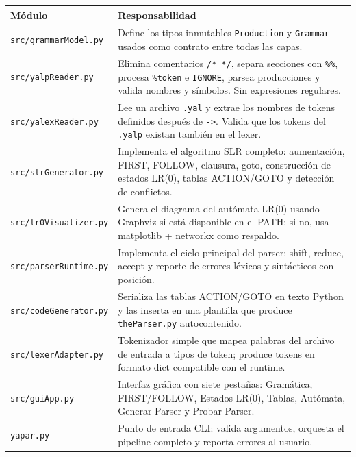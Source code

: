 \documentclass[11pt,a4paper]{article}
\begin{document}
\begin{center}
\begin{tabular}{lp{9cm}}
  \toprule
  \textbf{Módulo} & \textbf{Responsabilidad} \\
  \midrule
  \texttt{src/grammarModel.py}  &
    Define los tipos inmutables \texttt{Production} y \texttt{Grammar} usados
    como contrato entre todas las capas. \\
  \texttt{src/yalpReader.py}    &
    Elimina comentarios \texttt{/* */}, separa secciones con \texttt{\%\%},
    procesa \texttt{\%token} e \texttt{IGNORE}, parsea producciones y valida
    nombres y símbolos. Sin expresiones regulares. \\
  \texttt{src/yalexReader.py}   &
    Lee un archivo \texttt{.yal} y extrae los nombres de tokens definidos
    después de \texttt{->}. Valida que los tokens del \texttt{.yalp} existan
    también en el lexer. \\
  \texttt{src/slrGenerator.py}  &
    Implementa el algoritmo SLR completo: aumentación, FIRST, FOLLOW,
    clausura, goto, construcción de estados LR(0), tablas ACTION/GOTO y
    detección de conflictos. \\
  \texttt{src/lr0Visualizer.py} &
    Genera el diagrama del autómata LR(0) usando Graphviz si está disponible
    en el PATH; si no, usa matplotlib + networkx como respaldo. \\
  \texttt{src/parserRuntime.py} &
    Implementa el ciclo principal del parser: shift, reduce, accept y reporte
    de errores léxicos y sintácticos con posición. \\
  \texttt{src/codeGenerator.py} &
    Serializa las tablas ACTION/GOTO en texto Python y las inserta en una
    plantilla que produce \texttt{theParser.py} autocontenido. \\
  \texttt{src/lexerAdapter.py}  &
    Tokenizador simple que mapea palabras del archivo de entrada a tipos de
    token; produce tokens en formato dict compatible con el runtime. \\
  \texttt{src/guiApp.py}        &
    Interfaz gráfica con siete pestañas: Gramática, FIRST/FOLLOW, Estados
    LR(0), Tablas, Autómata, Generar Parser y Probar Parser. \\
  \texttt{yapar.py}             &
    Punto de entrada CLI: valida argumentos, orquesta el pipeline completo
    y reporta errores al usuario. \\
  \bottomrule
\end{tabular}
\end{center}
\end{document}
